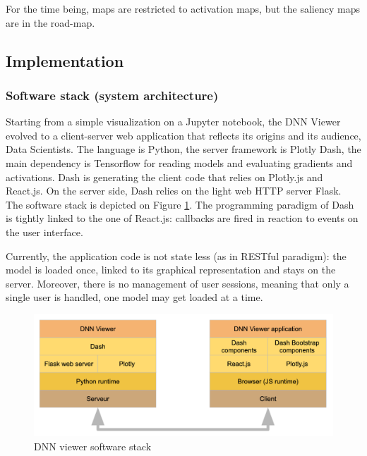 For the time being, maps are restricted to activation maps, but the saliency maps are in the road-map. 



\subsection{Implementation}
\label{sec-dnnviewer-implementation}


\subsubsection{Software stack (system architecture)}

Starting from a simple visualization on a Jupyter notebook, the DNN Viewer evolved to a client-server web application that reflects its origins and its audience, Data Scientists. The language is Python, the server framework is Plotly Dash, the main dependency is Tensorflow for reading models and evaluating gradients and activations. Dash is generating the client code that relies on Plotly.js and React.js. On the server side, Dash relies on the light web HTTP server Flask. The software stack is depicted on Figure \ref{fig:dnn-viewer-archi1}. The programming paradigm of Dash is tightly linked to the one of React.js: callbacks are fired in reaction to events on the user interface.

Currently, the application code is not state less (as in RESTful paradigm): the model is loaded once, linked to its graphical representation and stays on the server. Moreover, there is no management of user sessions, meaning that only a single user is handled, one model may get loaded at a time. 


\begin{figure}[H]
    \centering
    \includegraphics[scale=0.3]{images/dnn-viewer/Architecture.png}
    \caption{DNN viewer software stack}
    \label{fig:dnn-viewer-archi1}
\end{figure}

